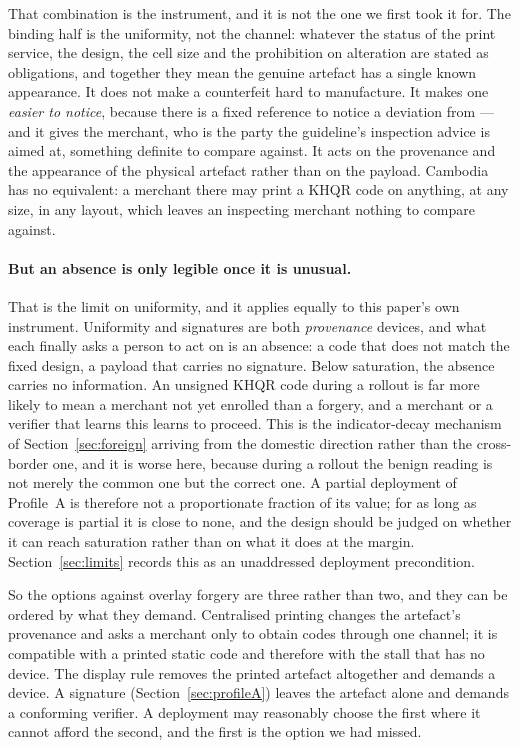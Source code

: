 \documentclass[10pt,a4paper,twocolumn]{article}
\begin{document}
That combination is the instrument, and it is not the one we first took it for.
The binding half is the uniformity, not the channel: whatever the status of the
print service, the design, the cell size and the prohibition on alteration are
stated as obligations, and together they mean the genuine artefact has a single
known appearance.
It does not make a counterfeit hard to manufacture. It makes one \emph{easier to
notice}, because there is a fixed reference to notice a deviation from --- and it
gives the merchant, who is the party the guideline's inspection advice is aimed
at, something definite to compare against. It acts on the provenance and the
appearance of the physical artefact rather than on the payload. Cambodia has no
equivalent: a merchant there may print a KHQR code on anything, at any size, in
any layout, which leaves an inspecting merchant nothing to compare against.

\paragraph{But an absence is only legible once it is unusual.} That is the
limit on uniformity, and it applies equally to this paper's own instrument.
Uniformity and signatures are both \emph{provenance} devices, and what each
finally asks a person to act on is an absence: a code that does not match the
fixed design, a payload that carries no signature. Below saturation, the
absence carries no information. An unsigned KHQR code during a rollout is far
more likely to mean a merchant not yet enrolled than a forgery, and a merchant
or a verifier that learns this learns to proceed. This is the indicator-decay
mechanism of Section~\ref{sec:foreign} arriving from the domestic direction
rather than the cross-border one, and it is worse here, because during a
rollout the benign reading is not merely the common one but the correct one. A
partial deployment of Profile~A is therefore not a proportionate fraction of
its value; for as long as coverage is partial it is close to none, and the
design should be judged on whether it can reach saturation rather than on what
it does at the margin. Section~\ref{sec:limits} records this as an unaddressed
deployment precondition.

So the options against overlay forgery are three rather than two, and they can
be ordered by what they demand. Centralised printing changes the artefact's
provenance and asks a merchant only to obtain codes through one channel; it is
compatible with a printed static code and therefore with the stall that has no
device. The display rule removes the printed artefact altogether and demands a
device. A signature (Section~\ref{sec:profileA}) leaves the artefact alone and
demands a conforming verifier. A deployment may reasonably choose the first
where it cannot afford the second, and the first is the option we had missed.
\end{document}
